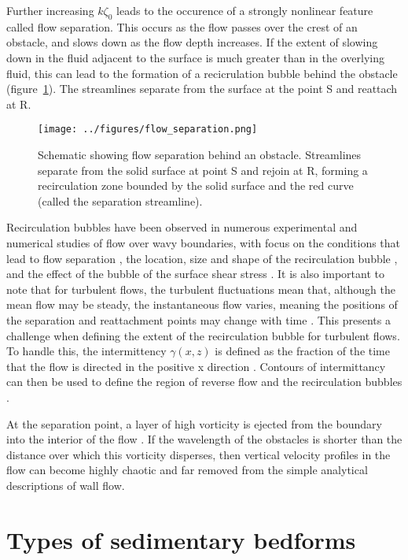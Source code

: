 \documentclass[12pt]{article}
\begin{document}
Further increasing $k \zeta_{0}$ leads to the occurence of a strongly nonlinear feature called flow separation. This occurs as the flow passes over the crest of an obstacle, and slows down as the flow depth increases. If the extent of slowing down in the fluid adjacent to the surface is much greater than in the overlying fluid, this can lead to the formation of a recicrulation bubble behind the obstacle (figure~\ref{fig:flow_sep}). The streamlines separate from the surface at the point S and reattach at R. 

\begin{figure}
  \texttt{[image: ../figures/flow\_separation.png]}
  \caption{Schematic showing flow separation behind an obstacle. Streamlines separate from the solid surface at point S and rejoin at R, forming a recirculation zone bounded by the solid surface and the red curve (called the separation streamline).}
  \label{fig:flow_sep}
\end{figure}

Recirculation bubbles have been observed in numerous experimental and numerical studies of flow over wavy boundaries, with focus on the conditions that lead to flow separation \citep{Zilker79, Richards81, Kuzan89}, the location, size and shape of the recirculation bubble \citep{Buckles84}, and the effect of the bubble of the surface shear stress \citep{Finnigan90, Henn99}. It is also important to note that for turbulent flows, the turbulent fluctuations mean that, although the mean flow may be steady, the instantaneous flow varies, meaning the positions of the separation and reattachment points may change with time \citep{Zilker79}. This presents a challenge when defining the extent of the recirculation bubble for turbulent flows. To handle this, the intermittency $\gamma(x,z)$ is defined as the fraction of the time that the flow is directed in the positive x direction \citep{Simpson81}. Contours of intermittancy can then be used to define the region of reverse flow and the recirculation bubbles \citep{Buckles84}. 

At the separation point, a layer of high vorticity is ejected from the boundary into the interior of the flow \citep{Yue06}. If the wavelength of the obstacles is shorter than the distance over which this vorticity disperses, then vertical velocity profiles in the flow can become highly chaotic and far removed from the simple analytical descriptions of wall flow. 

\section{Types of sedimentary bedforms}
\label{sec:sed_bed}
\end{document}
